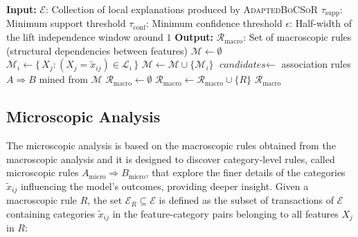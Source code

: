 \begin{algorithm}[H]
  \caption{Macroscopic Association Rule Analysis}\label{alg:macro-arm}
  \begin{algorithmic}[1]
    \Statex \textbf{Input:}
    \Statex \quad $\mathcal{E}$: Collection of local explanations produced by \textsc{AdaptedBoCSoR}
    \Statex \quad $\tau_{\mathrm{supp}}$: Minimum support threshold
    \Statex \quad $\tau_{\mathrm{conf}}$: Minimum confidence threshold
    \Statex \quad $\epsilon$: Half-width of the lift independence window around $1$
    \Statex \textbf{Output:}
    \Statex \quad $\mathcal{R}_{\mathrm{macro}}$: Set of macroscopic rules (structural dependencies between features)
      \State $\mathcal{M} \gets \emptyset$ 
        \State $\mathcal{M}_i \gets \{\, X_j : (X_j = \tilde{x}_{ij}) \in \mathcal{L}_i \,\}$ 
        \State $\mathcal{M} \gets \mathcal{M} \cup \{\mathcal{M}_i\}$
      \EndFor
      \State $\textit{candidates} \gets$ association rules $A \Rightarrow B$ mined from $\mathcal{M}$ 
      \State $\mathcal{R}_{\mathrm{macro}} \gets \emptyset$ 
          \State $\mathcal{R}_{\mathrm{macro}} \gets \mathcal{R}_{\mathrm{macro}} \cup \{R\}$ 
        \EndIf
      \EndFor
      \State \Return $\mathcal{R}_{\mathrm{macro}}$
    \EndProcedure
  \end{algorithmic}
\end{algorithm}

\subsection{Microscopic Analysis}

The microscopic analysis is based on the macroscopic rules obtained from the macroscopic analysis and it is designed to discover category-level rules, called microscopic rules $A_{\mathrm{micro}} \Rightarrow B_{\mathrm{micro}}$, that explore the finer details of the categories $\tilde{x}_{ij}$ influencing the model's outcomes, providing deeper insight. Given a macroscopic rule $R$, the set $\mathcal{E}_R \subseteq \mathcal{E}$ is defined as the subset of transactions of $\mathcal{E}$ containing categories $\tilde{x}_{ij}$ in the feature-category pairs belonging to all features $X_j$ in $R$:


